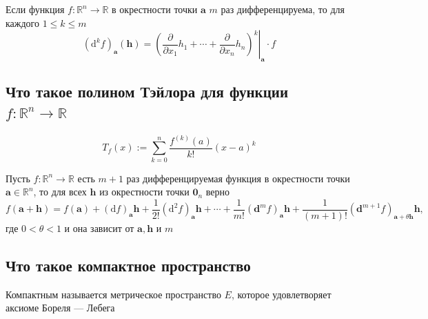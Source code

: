 \documentclass[a4paper]{article}
\newcommand{\m}[1]{\mathbf{#1}}
\begin{document}


Если функция $f:\mathbb{R}^n \to \mathbb{R}$ в окрестности точки $\m{a}$ $m$ раз дифференцируема, то для каждого $1 \le k \le m$
$$
\boxed{
(\mathrm{d}^kf)_\m{a}(\m{h})=     \left.\left(\frac{\partial}{\partial x_1} h_1 + \cdots + \frac{\partial }{\partial x_n}h_n \right)^k\right|_{\m{a}} \cdot f
}$$

\subsection{Что такое полином Тэйлора для функции $f:\mathbb{R}^{n}\to\mathbb{R}$}
$$T_f(x):=\sum_{k=0}^n \frac{f^{(k)}(a)}{k !}(x-a)^k$$

Пусть $f:\mathbb{R}^n \to \mathbb{R}$ есть $m+1$ раз дифференцируемая функция в окрестности точки $\m{a} \in \mathbb{R}^n$, то для всех $\m{h}$ из окрестности точки $\m{0}_n$ верно 
$$
f(\m{a} + \m{h}) = f(\m{a}) + (\mathrm{d}f)_\m{a} \m{h} + \frac{1}{2!} (\mathrm{d}^2f)_\m{a}\m{h} + \cdots + \frac{1}{m!} (\m{d}^mf)_\m{a}\m{h} + \frac{1}{(m+1)!} (\m{d}^{m+1}f)_{\m{a}+ \theta \m{h}}\m{h},
$$
где $0 < \theta < 1$ и она зависит от $\m{a}, \m{h}$ и $m$

\subsection{Что такое компактное пространство}
Компактным называется метрическое пространство $E$, которое удовлетворяет аксиоме Бореля — Лебега
\end{document}
